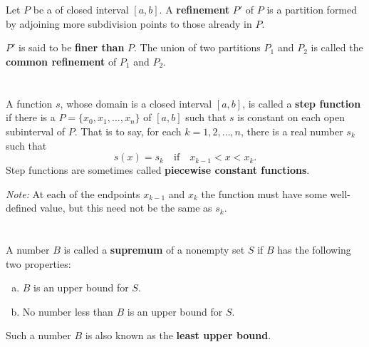 \documentclass{report}
\begin{document}
\section{}%
\label{sec:def-refinement}

Let $P$ be a  of closed interval $[a, b]$.
A \textbf{refinement} $P'$ of $P$ is a partition formed by adjoining more
  subdivision points to those already in $P$.

$P'$ is said to be \textbf{finer than} $P$. The union of two partitions $P_1$
  and $P_2$ is called the \textbf{common refinement} of $P_1$ and $P_2$.

\section{}%
\label{sec:def-step-function}

A function $s$, whose domain is a closed interval $[a, b]$, is called a
  \textbf{step function} if there is a 
  $P = \{x_0, x_1, \ldots, x_n\}$ of $[a, b]$ such that $s$ is constant on each
  open subinterval of $P$.
That is to say, for each $k = 1, 2, \ldots, n$, there is a real number $s_k$
  such that $$s(x) = s_k \quad\text{if}\quad x_{k-1} < x < x_k.$$
  Step functions are sometimes called \textbf{piecewise constant functions}.

\vspace{8pt}
\noindent
\textit{Note:} At each of the endpoints $x_{k-1}$ and $x_k$ the function must
  have some well-defined value, but this need not be the same as $s_k$.

\begin{definition}


\end{definition}

\section{}%
\label{sec:def-supremum}

A number $B$ is called a \textbf{supremum} of a nonempty set $S$ if $B$ has
  the following two properties:
  \begin{enumerate}[(a)]
    \item $B$ is an upper bound for $S$.
    \item No number less than $B$ is an upper bound for $S$.
  \end{enumerate}
Such a number $B$ is also known as the \textbf{least upper bound}.
\end{document}
